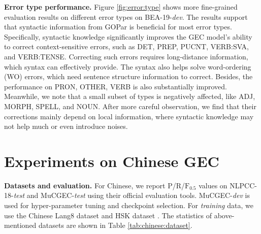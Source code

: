 \documentclass[11pt]{article}
\begin{document}
\textbf{Error type performance.} Figure \ref{fig:error:type} shows more fine-grained evaluation results on different error types on BEA-19-\textit{dev}.
The results support that syntactic information from GOPar is beneficial for most error types. Specifically, syntactic knowledge significantly improves the GEC model's ability to correct context-sensitive errors, such as DET, PREP, PUCNT, VERB:SVA, and VERB:TENSE. Correcting such errors requires long-distance information, which syntax can effectively provide. The syntax also helps solve word-ordering (WO) errors, which need sentence structure information to correct. Besides, the performance on PRON, OTHER, VERB is also substantially improved. Meanwhile, we note that a small subset of types is negatively affected, like ADJ, MORPH, SPELL, and NOUN. After more careful observation, we find that their corrections mainly depend on local information, where syntactic knowledge may not help much or even introduce noises.

 
\section{Experiments on Chinese GEC}
\label{sec:chinese:exp}




\textbf{Datasets and evaluation.} 
For Chinese, we report P/R/$\mbox{F}_{0.5}$ values on NLPCC-18-\textit{test} \citep{zhao2018overview} and MuCGEC-\emph{test} \cite{zhang2022mucgec} using their official evaluation tools. MuCGEC-\emph{dev} is used for hyper-parameter tuning and checkpoint selection. For \emph{training} data, we use the Chinese Lang8 dataset \citep{zhao2018overview} and HSK dataset \citep{zhang2009hsk}. The statistics of above-mentioned datasets are shown in Table \ref{tab:chinese:dataset}. 
\end{document}
